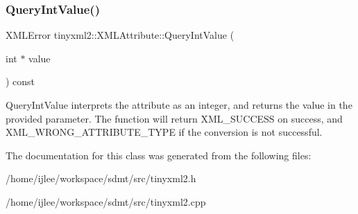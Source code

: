 \subsubsection{\texorpdfstring{Query\+Int\+Value()}{QueryIntValue()}}
{\footnotesize\ttfamily X\+M\+L\+Error tinyxml2\+::\+X\+M\+L\+Attribute\+::\+Query\+Int\+Value (\begin{DoxyParamCaption}\item[{int $\ast$}]{value }\end{DoxyParamCaption}) const}

Query\+Int\+Value interprets the attribute as an integer, and returns the value in the provided parameter. The function will return X\+M\+L\+\_\+\+S\+U\+C\+C\+E\+SS on success, and X\+M\+L\+\_\+\+W\+R\+O\+N\+G\+\_\+\+A\+T\+T\+R\+I\+B\+U\+T\+E\+\_\+\+T\+Y\+PE if the conversion is not successful. 

The documentation for this class was generated from the following files\+:\begin{DoxyCompactItemize}
\item 
/home/ijlee/workspace/sdmt/src/tinyxml2.\+h\item 
/home/ijlee/workspace/sdmt/src/tinyxml2.\+cpp\end{DoxyCompactItemize}
